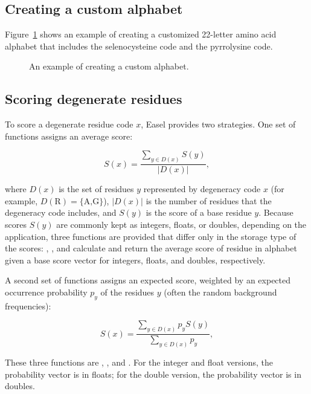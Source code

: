 \subsection{Creating a custom alphabet}

Figure~\ref{fig:alphabet_example2} shows an example of creating a
customized 22-letter amino acid alphabet that includes the 
selenocysteine code and the  pyrrolysine code.

\begin{figure}

\caption{An example of creating a custom alphabet.}
\label{fig:alphabet_example2}
\end{figure}



\subsection{Scoring degenerate residues}

To score a degenerate residue code $x$, Easel provides two strategies.
One set of functions assigns an average score:

\[
  S(x) =  \frac{\sum_{y \in D(x)}  S(y) } { |D(x)| },
\]

where $D(x)$ is the set of residues $y$ represented by degeneracy code
$x$ (for example, $D(\mbox{R}) = \{ \mbox{A,G} \}$), $| D(x) |$ is the
number of residues that the degeneracy code includes, and $S(y)$ is
the score of a base residue $y$. Because scores $S(y)$ are commonly
kept as integers, floats, or doubles, depending on the application,
three functions are provided that differ only in the storage type of
the scores: ,
, and
 calculate and return the average
score of residue  in alphabet  given a base score
vector  for integers, floats, and doubles,
respectively.

A second set of functions assigns an expected score, weighted by an
expected occurrence probability $p_y$ of the residues $y$ (often the
random background frequencies):

\[
  S(x) =  \frac{\sum_{y \in D(x)}  p_y S(y) } { \sum_{y \in D(x)} p_y },
\]

These three functions are ,
, and
.  For the integer and float
versions, the probability vector is in floats; for the double version,
the probability vector is in doubles.

